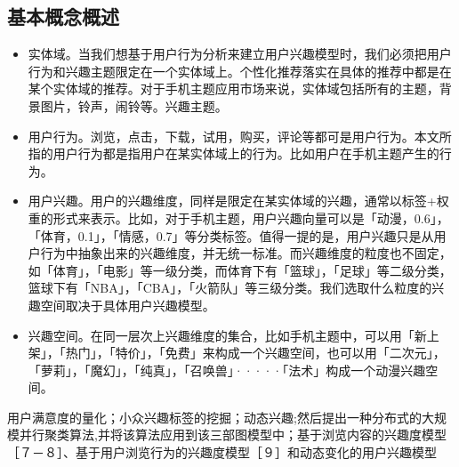   \subsection{基本概念概述}
  \begin{itemize}
  \item 实体域。当我们想基于用户行为分析来建立用户兴趣模型时，我们必须把用户行为和兴趣主题限定在一个实体域上。个性化推荐落实在具体的推荐中都是在某个实体域的推荐。对于手机主题应用市场来说，实体域包括所有的主题，背景图片，铃声，闹铃等。兴趣主题。
  \item 用户行为。浏览，点击，下载，试用，购买，评论等都可是用户行为。本文所指的用户行为都是指用户在某实体域上的行为。比如用户在手机主题产生的行为。
  \item 用户兴趣。用户的兴趣维度，同样是限定在某实体域的兴趣，通常以标签+权重的形式来表示。比如，对于手机主题，用户兴趣向量可以是「动漫，0.6」，「体育，0.1」，「情感，0.7」等分类标签。值得一提的是，用户兴趣只是从用户行为中抽象出来的兴趣维度，并无统一标准。而兴趣维度的粒度也不固定，如「体育」，「电影」等一级分类，而体育下有「篮球」，「足球」等二级分类，篮球下有「NBA」，「CBA」，「火箭队」等三级分类。我们选取什么粒度的兴趣空间取决于具体用户兴趣模型。
  \item 兴趣空间。在同一层次上兴趣维度的集合，比如手机主题中，可以用「新上架」，「热门」，「特价」，「免费」来构成一个兴趣空间，也可以用「二次元」，「萝莉」，「魔幻」，「纯真」，「召唤兽」·····「法术」构成一个动漫兴趣空间。
  \end{itemize}
用户满意度的量化；小众兴趣标签的挖掘；动态兴趣;然后提出一种分布式的大规模并行聚类算法,并将该算法应用到该三部图模型中；基于浏览内容的兴趣度模型［７－８］、基于用户浏览行为的兴趣度模型［９］和动态变化的用户兴趣模型
